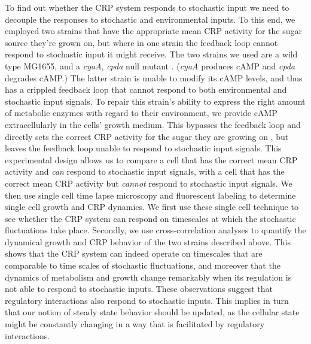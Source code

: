 To find out whether the CRP system responds to stochastic input we need to decouple the responses to stochastic and environmental inputs.
%
To this end, we employed two strains that have the appropriate mean CRP activity for the sugar source they're grown on, 
but where in one strain the feedback loop cannot respond to stochastic input it might receive.
%
The two strains we used are a wild type MG1655, and a \textit{cyaA}, \textit{cpda} null mutant \cite{Towbin2017}.
(\textit{cyaA} produces cAMP and \textit{cpda} degrades cAMP.)
%
The latter strain is unable to modify its cAMP levels, and thus has a crippled feedback loop that cannot respond to both environmental and stochastic input signals.
%
%
To repair this strain's ability to express the right amount of metabolic enzymes with regard to their environment, 
we provide cAMP extracellularly in the cells' growth medium.
%
This bypasses the feedback loop and directly sets the correct CRP activity for the sugar they are growing on \cite{Towbin2017},
but leaves the feedback loop unable to respond to stochastic input signals.
%
This experimental design allows us to compare a cell that has the correct mean CRP activity and \textit{can} respond to stochastic input signals, 
with a cell that has the correct mean CRP activity but \textit{cannot} respond to stochastic input signals.
%
We then use single cell time lapse microscopy and fluorescent labeling to determine single cell growth and CRP dynamics. 
%
We first use these single cell technique to see whether the CRP system can respond on timescales at which the stochastic fluctuations take place.
%
Secondly, we use cross-correlation analyses to quantify the dynamical growth and CRP behavior of the two strains described above.
%
This shows that the CRP system can indeed operate on timescales that are comparable to time scales of stochastic fluctuations, and moreover that
the dynamics of metabolism and growth change remarkably when its regulation is not able to respond to stochastic inputs.
%
These observations suggest that regulatory interactions also respond to stochastic inputs.
%
This implies in turn that our notion of steady state behavior should be updated, 
as the cellular state might be constantly changing in a way that is facilitated by regulatory interactions.


